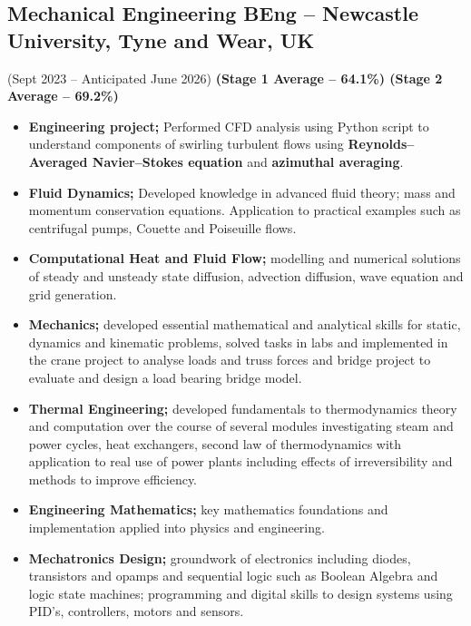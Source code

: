 \documentclass[../main.tex]{subfiles}
\begin{document}
    \subsection*{Mechanical Engineering BEng -- Newcastle University, Tyne and Wear, UK }(Sept 2023 -- Anticipated June 2026)
    \textbf{(Stage 1 Average -- 64.1\%) (Stage 2 Average -- 69.2\%)} 
    \begin{itemize}
        \item \textbf{Engineering project;} Performed CFD analysis using Python script to understand components of swirling turbulent flows using \textbf{Reynolds--Averaged Navier--Stokes equation} and \textbf{azimuthal averaging}.
        
        \item \textbf{Fluid Dynamics;} Developed knowledge in advanced fluid theory; mass and momentum conservation equations. Application to practical examples such as centrifugal pumps, Couette and Poiseuille flows.
        
        \item \textbf{Computational Heat and Fluid Flow;} modelling and numerical solutions of steady and unsteady state diffusion, advection diffusion, wave equation and grid generation.
        
        \item \textbf{Mechanics;} developed essential mathematical and analytical skills for static, dynamics and kinematic problems, solved tasks in labs and implemented in the crane project to analyse loads and truss forces and bridge project to evaluate and design a load bearing bridge model.
        
        \item \textbf{Thermal Engineering;} developed fundamentals to thermodynamics theory and computation over the course of several modules investigating steam and power cycles, heat exchangers, second law of thermodynamics with application to real use of power plants including effects of irreversibility and methods to improve efficiency.
        
        \item \textbf{Engineering Mathematics;} key mathematics foundations and implementation applied into physics and engineering.
        
        \item \textbf{Mechatronics Design;} groundwork of electronics including diodes, transistors and opamps and sequential logic such as Boolean Algebra and logic state machines; programming and digital skills to design systems using PID’s, controllers, motors and sensors.
        

\end{itemize}
\end{document}
